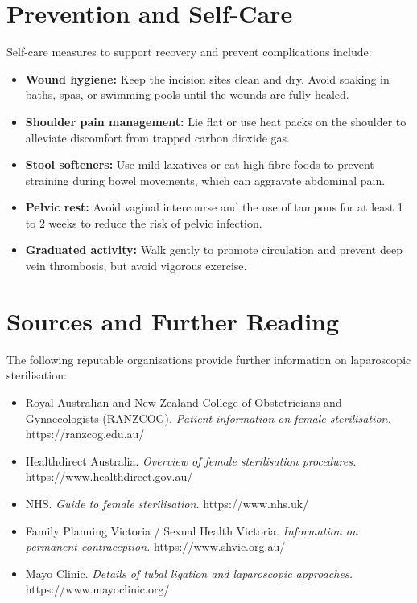 \section*{Prevention and Self-Care}
Self-care measures to support recovery and prevent complications include:
\begin{itemize}
    \item \textbf{Wound hygiene:} Keep the incision sites clean and dry. Avoid soaking in baths, spas, or swimming pools until the wounds are fully healed.
    \item \textbf{Shoulder pain management:} Lie flat or use heat packs on the shoulder to alleviate discomfort from trapped carbon dioxide gas.
    \item \textbf{Stool softeners:} Use mild laxatives or eat high-fibre foods to prevent straining during bowel movements, which can aggravate abdominal pain.
    \item \textbf{Pelvic rest:} Avoid vaginal intercourse and the use of tampons for at least 1 to 2 weeks to reduce the risk of pelvic infection.
    \item \textbf{Graduated activity:} Walk gently to promote circulation and prevent deep vein thrombosis, but avoid vigorous exercise.
\end{itemize}

\section*{Sources and Further Reading}
The following reputable organisations provide further information on laparoscopic sterilisation:
\begin{itemize}
    \item Royal Australian and New Zealand College of Obstetricians and Gynaecologists (RANZCOG). \textit{Patient information on female sterilisation.} https://ranzcog.edu.au/
    \item Healthdirect Australia. \textit{Overview of female sterilisation procedures.} https://www.healthdirect.gov.au/
    \item NHS. \textit{Guide to female sterilisation.} https://www.nhs.uk/
    \item Family Planning Victoria / Sexual Health Victoria. \textit{Information on permanent contraception.} https://www.shvic.org.au/
    \item Mayo Clinic. \textit{Details of tubal ligation and laparoscopic approaches.} https://www.mayoclinic.org/
\end{itemize}
